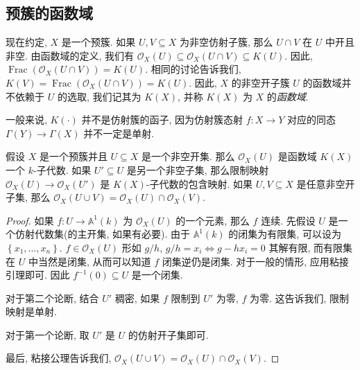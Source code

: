 \subsection{预簇的函数域}

现在约定, \( X \) 是一个预簇. 如果 \( U, V\subseteq X \) 为非空仿射子簇, 那么 \(
U \cap V \) 在 \( U \) 中开且非空. 由函数域的定义, 我们有 \( \mathscr{O}_X(U)
\subseteq \mathscr{O}_X(U \cap V) \subseteq K(U) \). 因此, \(
\operatorname{Frac}(\mathscr{O}_X(U \cap V)) = K(U) \). 相同的讨论告诉我们, \(
K(V) = \operatorname{Frac}(\mathscr{O}_X(U \cap V)) = K(U) \). 因此, \( X \)
的非空开子簇 \( U \) 的函数域并不依赖于 \( U \) 的选取, 我们记其为 \( K(X) \),
并称 \( K(X) \) 为 \( X \) 的\emph{函数域}.

\begin{remark}
  一般来说, \( K(\cdot) \) 并不是仿射簇的函子, 因为仿射簇态射 \( f: X \to Y \)
  对应的同态 \( \Gamma(Y) \to \Gamma(X) \) 并不一定是单射.
\end{remark}

\begin{proposition}
  \label{proposition-prevariaty-local-and-global}
  假设 \( X \) 是一个预簇并且 \( U \subseteq X \) 是一个非空开集. 那么 \(
  \mathscr{O}_X(U) \) 是函数域 \( K(X) \) 一个 \( k \)-子代数. 如果 \( U'
  \subseteq U \) 是另一个非空子集, 那么限制映射 \( \mathscr{O}_X(U) \to
  \mathscr{O}_X(U') \) 是 \( K(X) \)-子代数的包含映射. 如果 \( U, V \subseteq X
  \) 是任意非空开子集, 那么 \( \mathscr{O}_X(U \cup V) = \mathscr{O}_X(U) \cap
  \mathscr{O}_X(V) \).
\end{proposition}
\begin{proof}
  如果 \( f: U \to \mathbb{A}^1(k) \) 为 \( \mathscr{O}_X(U) \) 的一个元素, 那么
  \( f \) 连续. 先假设 \( U \) 是一个仿射代数集(的主开集, 如果有必要). 由于 \(
  \mathbb{A}^1(k) \) 的闭集为有限集, 可以设为 \( \left\lbrace x_1, \ldots, x_n
  \right\rbrace \). \( f \in \mathscr{O}_X(U) \) 形如 \( g / h \), \( g / h =
  x_i \iff g - hx_i = 0 \) 其解有限, 而有限集在 \( U \) 中当然是闭集,
  从而可以知道 \( f \) 闭集逆仍是闭集. 对于一般的情形, 应用粘接引理即可.
  因此 \( f^{-1}(0) \subseteq U \) 是一个闭集.

  对于第二个论断, 结合 \( U' \) 稠密, 如果 \( f \) 限制到 \( U' \) 为零, \( f \)
  为零. 这告诉我们, 限制映射是单射.

  对于第一个论断, 取 \( U' \) 是 \( U \) 的仿射开子集即可.

  最后, 粘接公理告诉我们, \( \mathscr{O}_X(U \cup V) = \mathscr{O}_X(U) \cap
  \mathscr{O}_X(V) \).
\end{proof}

